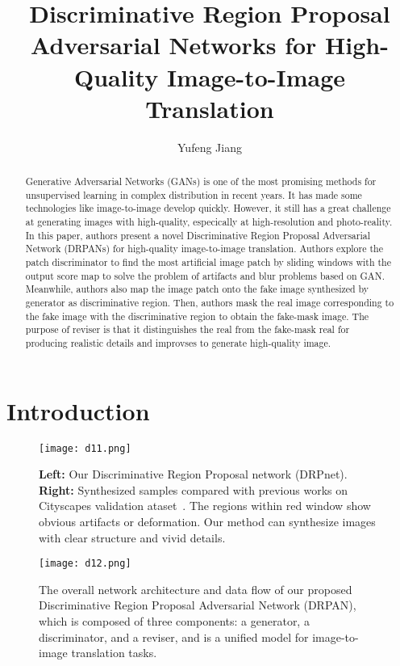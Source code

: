 \documentclass[10pt,twocolumn,letterpaper]{article}
\begin{document}
\title{Discriminative Region Proposal Adversarial Networks for High-Quality Image-to-Image Translation}
\author{Yufeng Jiang}
\maketitle

\begin{abstract}

Generative Adversarial Networks (GANs) is one of the most promising methods for unsupervised learning in complex distribution in recent years. It has made some technologies like image-to-image develop quickly. However, it still has a great challenge at generating images with high-quality, especically at high-resolution and photo-reality. In this paper, authors present a novel Discriminative Region Proposal Adversarial Network (DRPANs) for high-quality image-to-image translation. Authors explore the patch discriminator to find the most artificial image patch by sliding windows with the output score map to solve the problem of artifacts and blur problems based on GAN. Meanwhile, authors also map the image patch onto the fake image synthesized by generator as discriminative region. Then, authors mask the real image corresponding to the fake image with the discriminative region to obtain the fake-mask image. The purpose of reviser is that it distinguishes the real from the fake-mask real for producing realistic details and improvses to generate high-quality image. 

\end{abstract}

\section{Introduction}
\balance

\begin{figure*}
\begin{center}
\texttt{[image: d11.png]}
\end{center}
\caption{{\bf Left:} Our Discriminative Region Proposal network (DRPnet). {\bf Right:} Synthesized samples compared with previous works on Cityscapes validation ataset~\cite{The}. The regions within red window show obvious artifacts or deformation. Our method can synthesize images with clear structure and vivid details.}  
\label{fig1}
\end{figure*}

\begin{figure*}
\begin{center}
\texttt{[image: d12.png]}
\end{center}
\caption{The overall network architecture and data flow of our proposed Discriminative Region Proposal Adversarial Network (DRPAN), which is composed of three components: a generator, a discriminator, and a reviser, and is a unified model for image-to-image translation tasks.}
\label{fig2}
\end{figure*}
\end{document}
